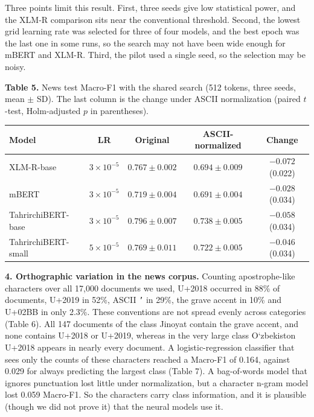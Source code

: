 \documentclass[11pt]{book}
\begin{document}
Three points limit this result. First, three seeds give low statistical power, and the XLM-R comparison sits near the conventional threshold. Second, the lowest grid learning rate was selected for three of four models, and the best epoch was the last one in some runs, so the search may not have been wide enough for mBERT and XLM-R. Third, the pilot used a single seed, so the selection may be noisy.

\begin{center}
\textbf{Table 5.} News test Macro-F1 with the shared search (512 tokens, three seeds, mean $\pm$ SD). The last column is the change under ASCII normalization (paired $t$-test, Holm-adjusted $p$ in parentheses).\\[2pt]
\begin{tabular}{lcccc}
\hline
Model & LR & Original & ASCII-normalized & Change \\
\hline
XLM-R-base & $3\times10^{-5}$ & $0.767\pm0.002$ & $0.694\pm0.009$ & $-0.072$ (0.022) \\
mBERT & $3\times10^{-5}$ & $0.719\pm0.004$ & $0.691\pm0.004$ & $-0.028$ (0.034) \\
TahrirchiBERT-base & $3\times10^{-5}$ & $0.796\pm0.007$ & $0.738\pm0.005$ & $-0.058$ (0.034) \\
TahrirchiBERT-small & $5\times10^{-5}$ & $0.769\pm0.011$ & $0.722\pm0.005$ & $-0.046$ (0.034) \\
\hline
\end{tabular}
\end{center}

\textbf{4. Orthographic variation in the news corpus.} Counting apostrophe-like characters over all 17,000 documents we used, U+2018 occurred in 88\% of documents, U+2019 in 52\%, ASCII \texttt{'} in 29\%, the grave accent in 10\% and U+02BB in only 2.3\%. These conventions are not spread evenly across categories (Table 6). All 147 documents of the class Jinoyat contain the grave accent, and none contains U+2018 or U+2019, whereas in the very large class O\textquoteleft zbekiston U+2018 appears in nearly every document. A logistic-regression classifier that sees only the counts of these characters reached a Macro-F1 of 0.164, against 0.029 for always predicting the largest class (Table 7). A bag-of-words model that ignores punctuation lost little under normalization, but a character n-gram model lost 0.059 Macro-F1. So the characters carry class information, and it is plausible (though we did not prove it) that the neural models use it.
\end{document}

